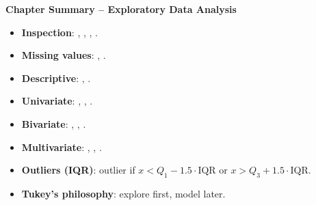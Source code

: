 \begin{keyformulas}
\textbf{Chapter Summary -- Exploratory Data Analysis}
\begin{itemize}
    \item \textbf{Inspection}: , , , .
    \item \textbf{Missing values}: , .
    \item \textbf{Descriptive}: , .
    \item \textbf{Univariate}: , , .
    \item \textbf{Bivariate}: , , .
    \item \textbf{Multivariate}: , , .
    \item \textbf{Outliers (IQR)}: outlier if $x < Q_1 - 1.5 \cdot \text{IQR}$ or $x > Q_3 + 1.5 \cdot \text{IQR}$.
    \item \textbf{Tukey's philosophy}: explore first, model later.
\end{itemize}
\end{keyformulas}
